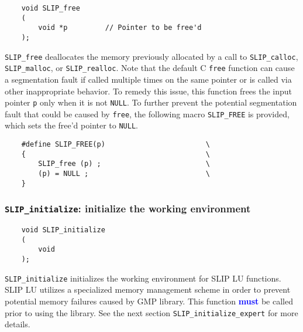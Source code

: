 \documentclass[12pt]{article}
\theoremstyle{definition}
\begin{document}
\begin{mdframed}[userdefinedwidth=6in]
{\footnotesize
\begin{verbatim}
    void SLIP_free
    (
        void *p         // Pointer to be free'd
    );
\end{verbatim}
} \end{mdframed}

\verb|SLIP_free| deallocates the memory previously allocated by a call to
\verb|SLIP_calloc|, \verb|SLIP_malloc|, or \verb|SLIP_realloc|. Note that the
default C \verb|free| function can cause a segmentation fault if called
multiple times on the same pointer or is called via other inappropriate
behavior. To remedy this issue, this function frees the input pointer \verb|p|
only when it is not \verb|NULL|. To further prevent the potential segmentation
fault that could be caused by \verb|free|, the following macro \verb|SLIP_FREE|
is provided, which sets the free'd pointer to \verb|NULL|.

\begin{mdframed}[userdefinedwidth=6in]
{\footnotesize
\begin{verbatim}
    #define SLIP_FREE(p)                        \
    {                                           \
        SLIP_free (p) ;                         \
        (p) = NULL ;                            \
    }
\end{verbatim}
} \end{mdframed}

\cprotect\subsubsection{\verb|SLIP_initialize|: initialize the working environment}

\begin{mdframed}[userdefinedwidth=6in]
{\footnotesize
\begin{verbatim}
    void SLIP_initialize
    (
        void
    );
\end{verbatim}
} \end{mdframed}

\verb|SLIP_initialize| initializes the working environment for SLIP LU
functions. SLIP LU utilizes a specialized memory management scheme in order to
prevent potential memory failures caused by GMP library. This function
\textcolor{blue}{\textbf{must}} be called prior to using the library. See the
next section \verb|SLIP_initialize_expert| for more details.
\end{document}
